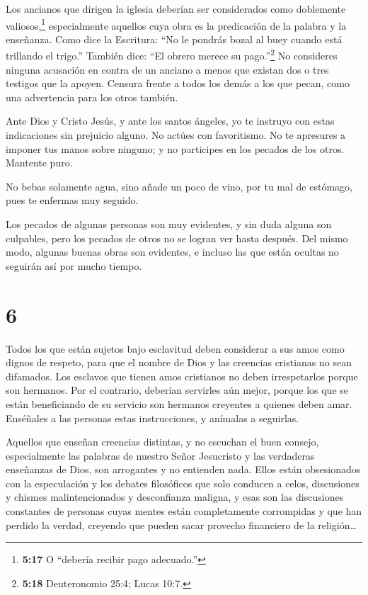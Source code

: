  Los ancianos que dirigen la iglesia deberían ser
considerados como doblemente valiosos,\footnote{\textbf{5:17} O
  ``debería recibir pago adecuado.''} especialmente aquellos cuya obra
es la predicación de la palabra y la enseñanza.  Como dice
la Escritura: ``No le pondrás bozal al buey cuando está trillando el
trigo.'' También dice: ``El obrero merece su pago.''\footnote{\textbf{5:18}
  Deuteronomio 25:4; Lucas 10:7.}  No consideres ninguna
acusación en contra de un anciano a menos que existan dos o tres
testigos que la apoyen.  Censura frente a todos los demás a
los que pecan, como una advertencia para los otros también.

 Ante Dios y Cristo Jesús, y ante los santos ángeles, yo te
instruyo con estas indicaciones sin prejuicio alguno. No actúes con
favoritismo.  No te apresures a imponer tus manos sobre
ninguno; y no participes en los pecados de los otros. Mantente puro.

 No bebas solamente agua, sino añade un poco de vino, por
tu mal de estómago, pues te enfermas muy seguido.

 Los pecados de algunas personas son muy evidentes, y sin
duda alguna son culpables, pero los pecados de otros no se logran ver
hasta después.  Del mismo modo, algunas buenas obras son
evidentes, e incluso las que están ocultas no seguirán así por mucho
tiempo.

\hypertarget{section-5}{%
\section{6}\label{section-5}}

 Todos los que están sujetos bajo esclavitud deben
considerar a sus amos como dignos de respeto, para que el nombre de Dios
y las creencias cristianas no sean difamados.  Los esclavos
que tienen amos cristianos no deben irrespetarlos porque son hermanos.
Por el contrario, deberían servirles aún mejor, porque los que se están
beneficiando de su servicio son hermanos creyentes a quienes deben amar.
Enséñales a las personas estas instrucciones, y anímalas a seguirlas.

 Aquellos que enseñan creencias distintas, y no escuchan el
buen consejo, especialmente las palabras de nuestro Señor Jesucristo y
las verdaderas enseñanzas de Dios,  son arrogantes y no
entienden nada. Ellos están obsesionados con la especulación y los
debates filosóficos que solo conducen a celos, discusiones y chismes
malintencionados y desconfianza maligna,  y esas son las
discusiones constantes de personas cuyas mentes están completamente
corrompidas y que han perdido la verdad, creyendo que pueden sacar
provecho financiero de la religión\ldots{}

